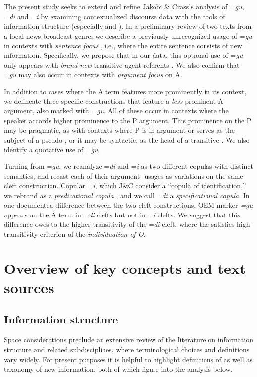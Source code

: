 \documentclass[output=paper,modfonts]{langscibook}
\begin{document}
The present study seeks to extend and refine Jakobi \& Crass’s analysis of =\textit{gu}, =\textit{di} and =\textit{i} by examining contextualized discourse data with the tools of information structure (especially \citealt{Prince1981} and \citealt{Lambrecht1994}). In a preliminary review of two texts from a local news broadcast genre, we describe a previously unrecognized usage of =\textit{gu} in contexts with \textit{sentence focus} \citep[233--235]{Lambrecht1994}, i.e., where the entire sentence consists of new information. Specifically, we propose that in our data, this optional use of =\textit{gu} only appears with \textit{brand new} transitive-agent referents \citep[233--237]{Prince1981}. We also confirm that =\textit{gu} may also occur in contexts with \textit{argument focus} \citep[228--233]{Lambrecht1994} on A.

In addition to cases where the A term features more prominently in its context, we delineate three specific constructions that feature a \textit{less} prominent A argument, also marked with =\textit{gu}. All of these occur in contexts where the speaker accords higher prominence to the P argument. This prominence on the P may be pragmatic, as with contexts where P is in argument  or serves as the subject of a pseudo-, or it may be syntactic, as the head of a transitive . We also identify a quotative use of =\textit{gu}. 

Turning from =\textit{gu}, we reanalyze =\textit{di} and =\textit{i} as two different copulas with distinct semantics, and recast each of their argument- usages as variations on the same cleft construction. Copular =\textit{i}, which J\&C consider a “copula of identification,” we rebrand as a \textit{predicational} \textit{copula} \citep{Mikkelsen2005}, and we call =\textit{di} a \textit{specificational} \textit{copula}. In one documented difference between the two cleft constructions, OEM marker \textit{=gu} appears on the A term in =\textit{di} clefts but not in =\textit{i} clefts. We suggest that this difference owes to the higher transitivity of the =\textit{di} cleft, where the  satisfies  high-transitivity criterion of the \textit{individuation of O}.


\section{Overview of key concepts and text sources}\label{sec:wolfe:2}
\subsection{Information structure}\label{sec:wolfe:2.1}
Space considerations preclude an extensive review of the literature on information structure and related subdisciplines, where terminological choices and definitions vary widely. For present purposes it is helpful to highlight  definitions of  as well as  taxonomy of new information, both of which figure into the analysis below. 
\end{document}
